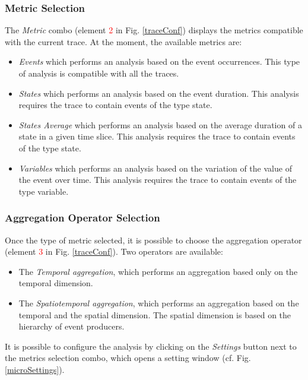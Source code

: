 \documentclass[twoside]{article}
\begin{document}
\begin{sloppypar}
\subsubsection{Metric Selection}
The \textit{Metric} combo (element \textcolor{red}{2} in Fig. \ref{traceConf}) displays the metrics compatible with the current trace.
At the moment, the available metrics are: 
\begin{itemize}
	\item \textit{Events} which performs an analysis based on the event occurrences. This type of analysis is compatible with all the traces.
	\item \textit{States} which performs an analysis based on the event duration. This analysis requires the trace to contain events of the type state.
	\item \textit{States Average} which performs an analysis based on the average duration of a state in a given time slice. This analysis requires the trace to contain events of the type state.
	\item \textit{Variables} which performs an analysis based on the variation of the value of the event over time. This analysis requires the trace to contain events of the type variable.
\end{itemize}

\subsubsection{Aggregation Operator Selection}
Once the type of metric selected, it is possible to choose the aggregation operator (element \textcolor{red}{3} in Fig. \ref{traceConf}). Two operators are available:
\begin{itemize}
	\item The \textit{Temporal aggregation}, which performs an aggregation based only on the temporal dimension.
	\item The \textit{Spatiotemporal aggregation}, which performs an aggregation based on the temporal and the spatial dimension. The spatial dimension is based on the hierarchy of event producers.
\end{itemize}

It is possible to configure the analysis by clicking on the \textit{Settings} button next to the metrics selection combo, which opens a setting window (cf. Fig. \ref{microSettings}).


\end{sloppypar}
\end{document}
